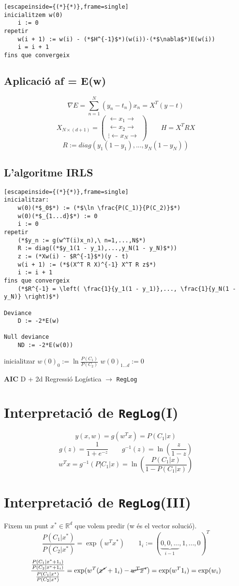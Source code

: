 \begin{lstlisting}[escapeinside={(*}{*)},frame=single]
inicialitzem w(0)
	i := 0
repetir
	w(i + 1) := w(i) - (*$H^{-1}$*)(w(i))·(*$\nabla$*)E(w(i))
	i = i + 1
fins que convergeix
\end{lstlisting}

\subsection{Aplicació af = E(w)}

$$
\nabla E = \sum_{n=1}^N (y_n - t_n) x_n = X^T(y-t)
$$
$$
X_{N\times (d+1)} =
\begin{pmatrix}
\longleftarrow x_1 \longrightarrow \\
\longleftarrow x_2 \longrightarrow \\
\vdots
\longleftarrow x_N \longrightarrow
\end{pmatrix}
\qquad
H = X^T R X
$$
$$
R := diag(y_1(1 - y_1), ..., y_N(1 - y_N))
$$


\subsection{L'algoritme IRLS}
\begin{lstlisting}[escapeinside={(*}{*)},frame=single]
inicialitzar: 
	w(0)(*$_0$*) := (*$\ln \frac{P(C_1)}{P(C_2)}$*)
	w(0)(*$_{1...d}$*) := 0
	i := 0
repetir
	(*$y_n := g(w^T(i)x_n),\ n=1,...,N$*)
	R := diag((*$y_1(1 - y_1),...,y_N(1 - y_N)$*))
	z := (*Xw(i) - $R^{-1}$*)(y - t)
	w(i + 1) := (*$(X^T R X)^{-1} X^T R z$*)
	i := i + 1
fins que convergeix
	(*$R^{-1} = \left( \frac{1}{y_1(1 - y_1)},..., \frac{1}{y_N(1 - y_N)} \right)$*)

Deviance
	D := -2*E(w)
	
Null deviance
	ND := -2*E(w(0))
\end{lstlisting}

\begin{algorithmic}[1]
	\State inicialitzar
	\State $w(0)_0 := \ln \frac{P(C_1)}{P(C_2)}$
	\State $w(0)_{1...d} := 0$
\end{algorithmic}

\textbf{AIC} D + 2d
Regressió Logística $\rightarrow$ \texttt{RegLog}

\section{Interpretació de \texttt{RegLog}(I)}
$$
y(x, w) = g(w^T x) = P(C_1|x)
$$
$$
g(z) = \frac{1}{1 + e^{-z}} \qquad g^{-1}(z) =  \ln\left(\frac{z}{1 - z}\right)
$$
$$
w^T x = g^{-1} (P|C_1|x) = \ln\left( \frac{P(C_1|x)}{1 - P(C_1|x)} \right)
$$

\section{Interpretació de \texttt{RegLog}(III)}
Fixem un punt $x^* \in \mathbb{R}^d$ que volem predir (w és el vector solució).
$$
\frac{P(C_1|x^*)}{P(C_2|x^*)} = \exp(w^T x^*)
\qquad 1_i := (\underbrace{0,0,...}_{i - 1},1,...,0)^T
$$
$$
\frac{\frac{P(C_1|x^* + 1_i)}{P(C_2|x^* + 1_i)}}{\frac{P(C_1|x^*)}{P(C_2|x^*)}} =
\exp(w^T(\cancel{x^*} + 1_i) - \cancel{w^T x^*}) = 
\exp(w^T 1_i) = \exp(w_i)
$$